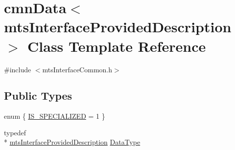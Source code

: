 \hypertarget{classcmn_data_3_01mts_interface_provided_description_01_4}{\section{cmn\-Data$<$ mts\-Interface\-Provided\-Description $>$ Class Template Reference}
\label{classcmn_data_3_01mts_interface_provided_description_01_4}
}


{\ttfamily \#include $<$mts\-Interface\-Common.\-h$>$}

\subsection*{Public Types}
\begin{DoxyCompactItemize}
\item 
enum \{ \hyperlink{classcmn_data_3_01mts_interface_provided_description_01_4_aa317194f1fe540140960ff55f8e9558baed983d480ee0b5e51c09af1074a53ee1}{I\-S\-\_\-\-S\-P\-E\-C\-I\-A\-L\-I\-Z\-E\-D} = 1
 \}
\item 
typedef \\*
\hyperlink{classmts_interface_provided_description}{mts\-Interface\-Provided\-Description} \hyperlink{classcmn_data_3_01mts_interface_provided_description_01_4_af19cd473dc5065308646606d55246bc6}{Data\-Type}
\end{DoxyCompactItemize}
